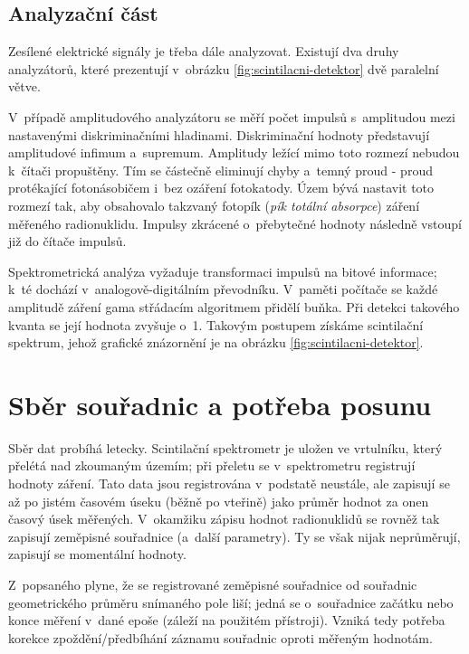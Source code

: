 \subsection{Analyzační část}
\label{analyzator}

Zesílené elektrické signály je třeba dále analyzovat. Existují dva druhy analyzátorů,
které prezentují v~obrázku \ref{fig:scintilacni-detektor} dvě paralelní větve. 

V~případě amplitudového analyzátoru se měří počet impulsů s~amplitudou mezi nastavenými
diskriminačními hladinami. Diskriminační hodnoty představují amplitudové infimum a~supremum.
Amplitudy ležící mimo toto rozmezí nebudou k~čítači propuštěny. Tím se částečně
eliminují chyby a~temný proud - proud protékající fotonásobičem i~bez ozáření fotokatody.
Územ bývá nastavit toto rozmezí tak, aby obsahovalo takzvaný fotopík (\textit{pík totální absorpce})
záření měřeného radionuklidu. Impulsy zkrácené o~přebytečné hodnoty následně vstoupí již do čítače
impulsů. 

Spektrometrická analýza vyžaduje transformaci impulsů na bitové informace; k~té dochází
v~analogově-digitálním převodníku. V~paměti počítače se každé amplitudě záření gama
střádacím algoritmem přidělí buňka. Při detekci takového kvanta se její hodnota zvyšuje o~1.
Takovým postupem získáme scintilační spektrum, jehož grafické
znázornění je na obrázku \ref{fig:scintilacni-detektor}. 

\section{Sběr souřadnic a potřeba posunu}
\label{potreba posunu}

Sběr dat probíhá letecky. Scintilační spektrometr je uložen ve vrtulníku, který přelétá nad zkoumaným
územím; při přeletu se v~spektrometru registrují hodnoty záření. Tato data jsou registrována v~podstatě
neustále, ale zapisují se až po jistém časovém úseku (běžně po vteřině) jako průměr hodnot za onen
časový úsek měřených. V~okamžiku zápisu hodnot radionuklidů se rovněž tak zapisují zeměpisné souřadnice
(a~další parametry). Ty se však nijak neprůměrují, zapisují se momentální hodnoty. 

Z~popsaného plyne, že se registrované zeměpisné souřadnice od souřadnic geometrického průměru snímaného
pole liší; jedná se o~souřadnice začátku nebo konce měření v~dané epoše (záleží na použitém přístroji).
Vzniká tedy potřeba korekce zpoždění/předbíhání záznamu souřadnic oproti měřeným hodnotám. 

